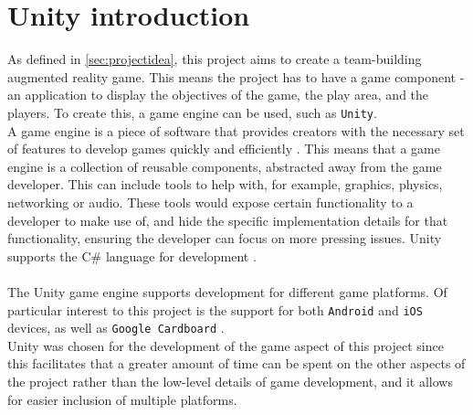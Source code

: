 \section{Unity introduction}\label{sec:unity-intro}
As defined in \autoref{sec:projectidea}, this project aims to create a team-building augmented reality game.
This means the project has to have a game component - an application to display the objectives of the game, the play area, and the players.
To create this, a game engine can be used, such as \texttt{Unity}. \\
A game engine is a piece of software that provides creators with the necessary set of features to develop games quickly and efficiently \cite{gameengine}.
This means that a game engine is a collection of reusable components, abstracted away from the game developer.
This can include tools to help with, for example, graphics, physics, networking or audio.
These tools would expose certain functionality to a developer to make use of, and hide the specific implementation details for that functionality, ensuring the developer can focus on more pressing issues.
Unity supports the C\# language for development \cite{unitylanguage}.
\\\\
The Unity game engine supports development for different game platforms.
Of particular interest to this project is the support for both \texttt{Android} and \texttt{iOS} devices, as well as \texttt{Google Cardboard} \cite{unityplatforms}.\\
Unity was chosen for the development of the game aspect of this project since this facilitates that a greater amount of time can be spent on the other aspects of the project rather than the low-level details of game development, and it allows for easier inclusion of multiple platforms.
